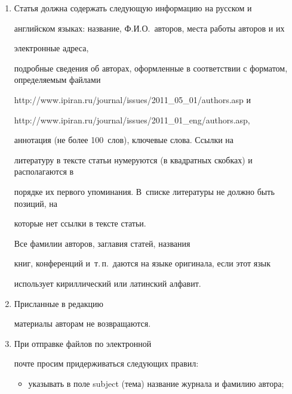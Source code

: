 {{\begin{enumerate}
слов, кроме стандартных, не применяются. Все страницы рукописи должны быть


пронумерованы.


\item Статья должна содержать следующую информацию на русском и


английском языках: название, Ф.И.О.\ авторов, места работы авторов и их


электронные адреса,


подробные сведения об авторах, оформленные в соответствии с форматом, определяемым файлами





\noindent


{\sf http://www.ipiran.ru/journal/issues/2011\_05\_01/authors.asp} и 





\noindent


{\sf http://www.ipiran.ru/journal/issues/2011\_01\_eng/authors.asp},





\noindent


аннотация (не более 100~слов), ключевые слова. Ссылки на


литературу в тексте статьи нумеруются (в квадратных скобках) и располагаются в


порядке их первого упоминания. В~списке литературы не должно быть позиций, на 


которые нет ссылки в тексте статьи.


Все фамилии авторов, заглавия статей, названия


книг, конференций и~т.\,п.\ даются на языке оригинала, если этот язык


использует кириллический или латинский алфавит.


\item Присланные в редакцию


материалы авторам не возвращаются.


\item При отправке файлов по электронной


почте просим придерживаться следующих правил:


\begin{itemize}


\item указывать в поле subject (тема) название журнала и фамилию автора;



\end{itemize}
\end{enumerate}}}
